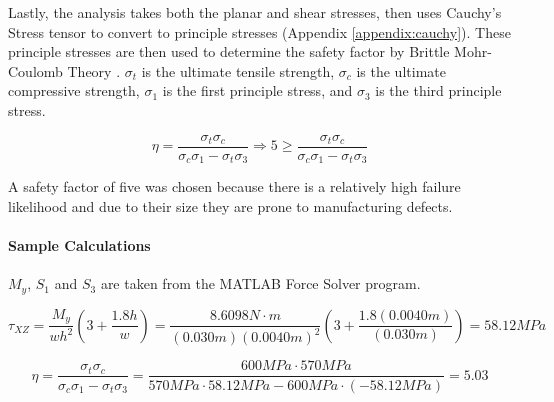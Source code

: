 \documentclass[../main.tex]{subfiles}
\begin{document}
Lastly, the analysis takes both the planar and shear stresses, then uses Cauchy's Stress tensor to convert to principle stresses (Appendix \ref{appendix:cauchy}). These principle stresses are then used to determine the safety factor by Brittle Mohr-Coulomb Theory \cite[227]{shigley}. $\sigma_t$ is the ultimate tensile strength, $\sigma_c$ is the ultimate compressive strength, $\sigma_1$ is the first principle stress, and $\sigma_3$ is the third principle stress.

\begin{equation}
\eta = \frac{\sigma_t\sigma_c} {\sigma_c\sigma_1 -\sigma_t\sigma_3} \Rightarrow 5 \geq \frac{\sigma_t\sigma_c} {\sigma_c\sigma_1 -\sigma_t\sigma_3}
\end{equation}

A safety factor of five was chosen because there is a relatively high failure likelihood and due to their size they are prone to manufacturing defects.

\paragraph*{Sample Calculations}
$M_y$, $S_1$ and $S_3$ are taken from the MATLAB Force Solver program.

$$\tau_{XZ} = \dfrac{M_{y}}{wh^2}\left(3+\frac{1.8h}{w}\right)= \dfrac{8.6098N\cdot{}m}{(0.030m)(0.0040m)^2}\left(3+\frac{1.8(0.0040m)}{(0.030m)}\right)=58.12MPa$$

$$\eta = \frac{\sigma_t\sigma_c} {\sigma_c\sigma_1 -\sigma_t\sigma_3}=\frac{600MPa\cdot{}570MPa} {570MPa\cdot{}58.12MPa - 600MPa\cdot{}(-58.12MPa)}=5.03$$
\end{document}
